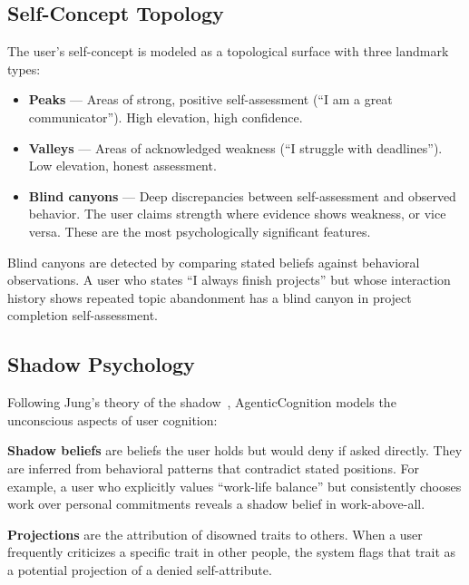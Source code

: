 \documentclass[10pt, twocolumn]{article}
\begin{document}
\subsection{Self-Concept Topology}
\label{sec:topology}

The user's self-concept is modeled as a topological surface with three landmark types:

\begin{itemize}[nosep, leftmargin=*]
  \item \textbf{Peaks} --- Areas of strong, positive self-assessment (``I am a great communicator''). High elevation, high confidence.
  \item \textbf{Valleys} --- Areas of acknowledged weakness (``I struggle with deadlines''). Low elevation, honest assessment.
  \item \textbf{Blind canyons} --- Deep discrepancies between self-assessment and observed behavior. The user claims strength where evidence shows weakness, or vice versa. These are the most psychologically significant features.
\end{itemize}

Blind canyons are detected by comparing stated beliefs against behavioral observations. A user who states ``I always finish projects'' but whose interaction history shows repeated topic abandonment has a blind canyon in project completion self-assessment.

\subsection{Shadow Psychology}
\label{sec:shadow}

Following Jung's theory of the shadow~\cite{jung1959archetypes}, AgenticCognition models the unconscious aspects of user cognition:

\textbf{Shadow beliefs} are beliefs the user holds but would deny if asked directly. They are inferred from behavioral patterns that contradict stated positions. For example, a user who explicitly values ``work-life balance'' but consistently chooses work over personal commitments reveals a shadow belief in work-above-all.

\textbf{Projections} are the attribution of disowned traits to others. When a user frequently criticizes a specific trait in other people, the system flags that trait as a potential projection of a denied self-attribute.
\end{document}
